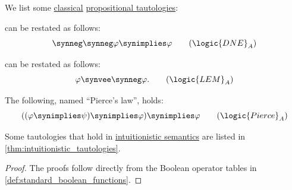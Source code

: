 \begin{proposition}\label{thm:classical_tautologies}
  We list some \hyperref[def:truth_value_algebra/classical]{classical} \hyperref[def:tautology]{propositional tautologies}:
  \begin{thmenum}
      can be restated as follows:
    \begin{equation}\label{eq:thm:classical_tautologies/dne}
      \synneg \synneg \varphi \synimplies \varphi \tag{\ensuremath{ \logic{DNE}_A }}
    \end{equation}

      can be restated as follows:
    \begin{equation}\label{eq:thm:classical_tautologies/lem}
      \varphi \synvee \synneg \varphi. \tag{\ensuremath{ \logic{LEM}_A }}
    \end{equation}

     The following, named \enquote{Pierce's law}, holds:
    \begin{equation}\label{eq:thm:classical_tautologies/pierce}
      ((\varphi \synimplies \psi) \synimplies \varphi) \synimplies \varphi \tag{\ensuremath{ \logic{Pierce}_A }}
    \end{equation}
  \end{thmenum}
\end{proposition}
\begin{comments}
  \item Some tautologies that hold in \hyperref[def:truth_value_algebra/intuitionistic]{intuitionistic semantics} are listed in \cref{thm:intuitionistic_tautologies}.
\end{comments}
\begin{proof}
  The proofs follow directly from the Boolean operator tables in \cref{def:standard_boolean_functions}.
\end{proof}

